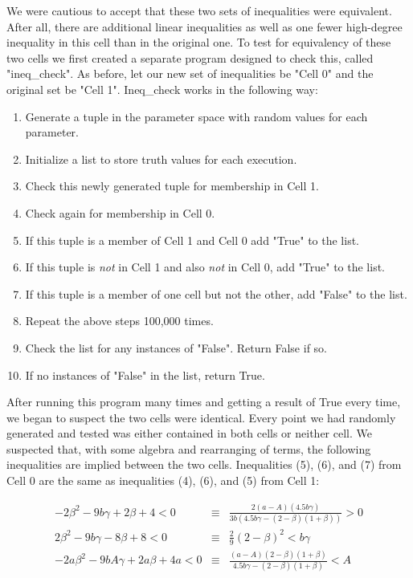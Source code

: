 \documentclass{article}
\begin{document}
We were cautious to accept that these two sets of inequalities were equivalent. After all, there are additional linear inequalities as well as one fewer high-degree inequality in this cell than in the original one. To test for equivalency of these two cells we first created a separate program designed to check this, called "ineq\_check". As before, let our new set of inequalities be "Cell 0" and the original set be "Cell 1". Ineq\_check works in the following way:
\begin{enumerate}
    \item Generate a tuple in the parameter space with random values for each parameter.
    \item Initialize a list to store truth values for each execution.
    \item Check this newly generated tuple for membership in Cell 1.
    \item Check again for membership in Cell 0. 
    \item If this tuple is a member of Cell 1 and Cell 0 add "True" to the list.
    \item If this tuple is \emph{not} in Cell 1 and also \emph{not} in Cell 0, add "True" to the list.
    \item If this tuple is a member of one cell but not the other, add "False" to the list.
    \item Repeat the above steps 100,000 times.
    \item Check the list for any instances of "False". Return False if so.
    \item If no instances of "False" in the list, return True.
\end{enumerate}

After running this program many times and getting a result of True every time, we began to suspect the two cells were identical. Every point we had randomly generated and tested was either contained in both cells or neither cell. We suspected that, with some algebra and rearranging of terms, the following inequalities are implied between the two cells. Inequalities (5), (6), and (7) from Cell 0 are the same as inequalities (4), (6), and (5) from Cell 1:

\begin{eqnarray}
-2\beta^{2} - 9b\gamma + 2\beta + 4 < 0 &\equiv& \frac{2(a-A)(4.5b\gamma)}{3b(4.5b\gamma-(2-\beta)(1+\beta))}>0\\
2\beta^{2} - 9b\gamma - 8\beta + 8 < 0 &\equiv& \frac{2}{9}(2-\beta)^{2}<b\gamma\\
-2a\beta^{2} -9bA\gamma + 2a\beta +4a < 0 &\equiv& \frac{(a-A)(2-\beta)(1+\beta)}{4.5b\gamma-(2-\beta)(1+\beta)}<A
\end{eqnarray}
\end{document}
